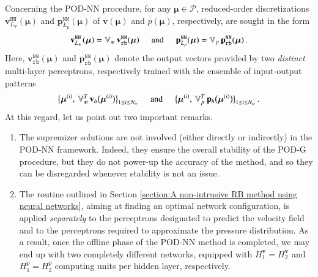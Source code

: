 \documentclass{elsarticle}
\numberwithin{equation}{section}
\theoremstyle{theorem}
\theoremstyle{definition}
\theoremstyle{remark}
\theoremstyle{proposition}
\numberwithin{figure}{section}
\newcommand{\bg}[1]{\boldsymbol{#1}}
\begin{document}
		Concerning the POD-NN procedure, for any $\bg{\mu} \in \mathcal{P}$, reduced-order discretizations $\mathbf{v}_{L_{\bg{v}}}^{\texttt{NN}}(\bg{\mu})$ and $\mathbf{p}_{L_p}^{\texttt{NN}}(\bg{\mu})$ of $\bg{v}(\bg{\mu})$ and $p(\bg{\mu})$, respectively, are sought in the form
		\begin{equation*}
			\mathbf{v}_{L_{\bg{v}}}^{\texttt{NN}}(\bg{\mu}) = \mathbb{V}_{\bg{v}} \, \mathbf{v}_{\texttt{rb}}^{\texttt{NN}}(\bg{\mu}) \hspace*{0.5cm} \text{and} \hspace*{0.5cm} \mathbf{p}_{L_p}^{\texttt{NN}}(\bg{\mu}) = \mathbb{V}_{p} \, \mathbf{p}_{\texttt{rb}}^{\texttt{NN}}(\bg{\mu}) \, .
		\end{equation*}
		Here, $\mathbf{v}_{\texttt{rb}}^{\texttt{NN}}(\bg{\mu})$ and $\mathbf{p}_{\texttt{rb}}^{\texttt{NN}}(\bg{\mu})$ denote the output vectors provided by two \emph{distinct} multi-layer perceptrons, respectively trained with the ensemble of input-output patterns
		\begin{equation*}
			\big\lbrace \bg{\mu}^{(i)}, \, \mathbb{V}_{\bg{v}}^T \, \mathbf{v}_h \big( \bg{\mu}^{(i)} \big) \big\rbrace_{1 \leq i \leq N_{tr}} \hspace*{0.5cm} \text{and} \hspace*{0.5cm} \big\lbrace \bg{\mu}^{(i)}, \, \mathbb{V}_{p}^T \, \mathbf{p}_h \big( \bg{\mu}^{(i)} \big) \big\rbrace_{1 \leq i \leq N_{tr}} \, .
		\end{equation*}
		At this regard, let us point out two important remarks.
		\begin{enumerate}[label=(\roman*)]
			\item The supremizer solutions are not involved (either directly or indirectly) in the POD-NN framework. Indeed, they ensure the overall stability of the POD-G procedure, but they do not power-up the accuracy of the method, and so they can be disregarded whenever stability is not an issue.
			\item The routine outlined in Section \ref{section:A non-intrusive RB method using neural networks}, aiming at finding an optimal network configuration, is applied \emph{separately} to the perceptrons designated to predict the velocity field and to the perceptrons required to approximate the pressure distribution. As a result, once the offline phase of the POD-NN method is completed, we may end up with two completely different networks, equipped with $H_1^{\bg{v}} = H_2^{\bg{v}}$ and $H_1^p = H_2^p$ computing units per hidden layer, respectively.  
		\end{enumerate}
\end{document}
